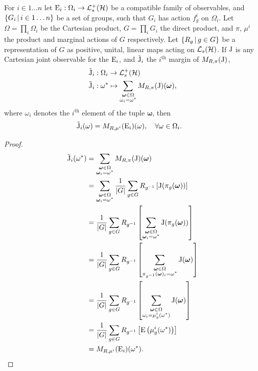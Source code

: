 \begin{lem}\label{lem:margins-inv-mean-same}
  For $i\in 1\hdots n$ let $\ope_i:\Omega_i \to \posops[\hcal]$ be a compatible family of observables, and $\left\{G_i\,\middle|\,i\in 1\hdots n\right\}$ be a set of groups, such that $G_i$ has action $f_g^i$ on $\Omega_i$. Let $\Omega = \prod_i \Omega_i$ be the Cartesian product, $G = \prod_i G_i$ the direct product, and $\pi$, $\mu^i$ the product and marginal actions of $G$ respectively. Let $\left\{R_g\,\middle|\,g\in G\right\}$ be a representation of $G$ as positive, unital, linear maps acting on $\saops[\hcal]$. If $\operatorname{J}$ is any Cartesian joint observable for the $\operatorname{E}_i$, and $\tilde{\operatorname{J}}_i$ the $i^\text{th}$ margin of $M_{R,\pi}(\operatorname{J})$,
  \begin{align}
    \tilde{\opj}_i&: \Omega_i \to \posops[\hcal]\\
    \tilde{\opj}_i &: \omega^* \mapsto \sum_{\substack{\bm{\omega} \in \Omega\\ \omega_i = \omega^*}}M_{R,\pi}(\opj)(\bm{\omega}),
  \end{align}
  where $\omega_i$ denotes the $i^\text{th}$ element of the tuple $\bm{\omega}$, then
  \begin{align}
    \tilde{\operatorname{J}}_i(\omega) &= M_{R,\mu^i}(\operatorname{E}_i)(\omega), \quad \forall \omega \in \Omega_i.
  \end{align} %
  \begin{proof}
    \begin{align}
      \tilde{\operatorname{J}}_i(\omega^*) &= \sum_{\substack{\bm{\omega} \in \Omega\\ \bm{\omega}_i = \omega^*}}M_{R,\pi}(\operatorname{J})(\bm{\omega})\\
                               &= \sum_{\substack{\bm{\omega} \in \Omega\\ \bm{\omega}_i = \omega^*}} \frac{1}{{\left\lvert{G}\right\rvert}}\sum_{g\in G} R_{g^{-1}}\left[\operatorname{J}(\pi_g(\bm{\omega}))\right]\\
                               &= \frac{1}{{\left\lvert{G}\right\rvert}}\sum_{g\in G} R_{g^{-1}}\left[\sum_{\substack{\bm{\omega} \in \Omega\\ \bm{\omega}_i = \omega^*}} \operatorname{J}(\pi_g(\bm{\omega}))\right]\\
                               &= \frac{1}{{\left\lvert{G}\right\rvert}}\sum_{g\in G} R_{g^{-1}}\left[\sum_{\substack{\bm{\omega} \in \Omega\\ \pi_{g^{-1}}(\bm{\omega})_i = \omega^*}} \operatorname{J}(\bm{\omega})\right]\\
                               &= \frac{1}{{\left\lvert{G}\right\rvert}}\sum_{g\in G} R_{g^{-1}}\left[\sum_{\substack{\bm{\omega} \in \Omega\\ \omega_i = \mu^i_{g}(\omega^*)}} \operatorname{J}(\bm{\omega})\right]\\
                               &= \frac{1}{{\left\lvert{G}\right\rvert}}\sum_{g\in G} R_{g^{-1}}\left[\operatorname{E}\left(\mu^i_{g}(\omega^*)\right)\right]\\
                               &= M_{R, \mu^i}(\operatorname{E}_i)(\omega^*).
    \end{align}
  \end{proof}
\end{lem}

